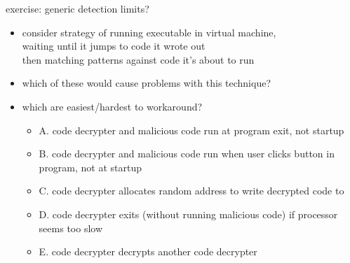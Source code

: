 \begin{frame}{exercise: generic detection limits?}
    \begin{itemize}
    \item consider strategy of running executable in virtual machine, \\
          waiting until it jumps to code it wrote out \\
          then matching patterns against code it's about to run
    \item which of these would cause problems with this technique?
    \item which are easiest/hardest to workaround?
    \vspace{.5cm}
    \begin{itemize}
    \item A. code decrypter and malicious code run at program exit, not startup
    \item B. code decrypter and malicious code run when user clicks button in program, not at startup
    \item C. code decrypter allocates random address to write decrypted code to
    \item D. code decrypter exits (without running malicious code) if processor seems too slow
    \item E. code decrypter decrypts another code decrypter
    \end{itemize}
    \end{itemize}
\end{frame}
